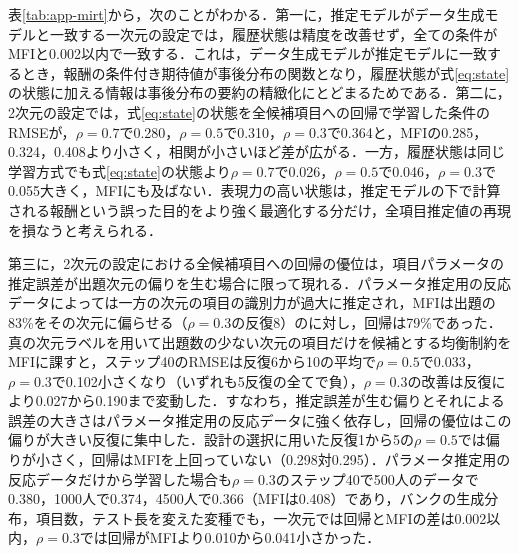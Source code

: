 \documentclass[paper]{ieicej}
\begin{document}
表\ref{tab:app-mirt}から，次のことがわかる．第一に，推定モデルがデータ生成モデルと一致する一次元の設定では，履歴状態は精度を改善せず，全ての条件がMFIと0.002以内で一致する．これは，データ生成モデルが推定モデルに一致するとき，報酬の条件付き期待値が事後分布の関数となり，履歴状態が式\eqref{eq:state}の状態に加える情報は事後分布の要約の精緻化にとどまるためである．第二に，2次元の設定では，式\eqref{eq:state}の状態を全候補項目への回帰で学習した条件のRMSEが，$\rho=0.7$で0.280，$\rho=0.5$で0.310，$\rho=0.3$で0.364と，MFIの0.285，0.324，0.408より小さく，相関が小さいほど差が広がる．一方，履歴状態は同じ学習方式でも式\eqref{eq:state}の状態より$\rho=0.7$で0.026，$\rho=0.5$で0.046，$\rho=0.3$で0.055大きく，MFIにも及ばない．表現力の高い状態は，推定モデルの下で計算される報酬という誤った目的をより強く最適化する分だけ，全項目推定値の再現を損なうと考えられる．

第三に，2次元の設定における全候補項目への回帰の優位は，項目パラメータの推定誤差が出題次元の偏りを生む場合に限って現れる．パラメータ推定用の反応データによっては一方の次元の項目の識別力が過大に推定され，MFIは出題の83\%をその次元に偏らせる（$\rho=0.3$の反復8）のに対し，回帰は79\%であった．真の次元ラベルを用いて出題数の少ない次元の項目だけを候補とする均衡制約をMFIに課すと，ステップ40のRMSEは反復6から10の平均で$\rho=0.5$で0.033，$\rho=0.3$で0.102小さくなり（いずれも5反復の全てで負），$\rho=0.3$の改善は反復により0.027から0.190まで変動した．すなわち，推定誤差が生む偏りとそれによる誤差の大きさはパラメータ推定用の反応データに強く依存し，回帰の優位はこの偏りが大きい反復に集中した．設計の選択に用いた反復1から5の$\rho=0.5$では偏りが小さく，回帰はMFIを上回っていない（0.298対0.295）．パラメータ推定用の反応データだけから学習した場合も$\rho=0.3$のステップ40で500人のデータで0.380，1000人で0.374，4500人で0.366（MFIは0.408）であり，バンクの生成分布，項目数，テスト長を変えた変種でも，一次元では回帰とMFIの差は0.002以内，$\rho=0.3$では回帰がMFIより0.010から0.041小さかった．
\end{document}
